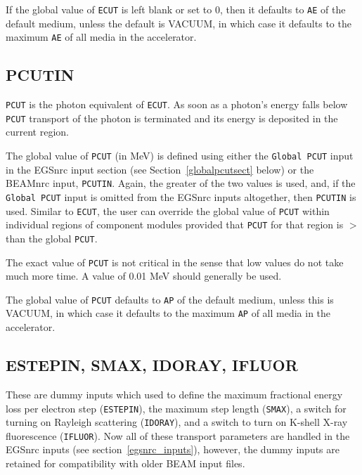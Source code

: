 \documentclass[12pt,twoside]{article}
\begin{document}
If the global value of \verb+ECUT+ is left blank or set to 0, then it defaults
to \verb+AE+ of the default medium, unless the default is VACUUM, in which
case it defaults to the maximum \verb+AE+ of all media in the accelerator.

\subsection{ PCUTIN}  \label{PCUTIN} 

{\tt PCUT} is the photon equivalent of {\tt ECUT}.  As soon as a
photon's energy falls below {\tt PCUT} transport of the photon is
terminated and its energy is deposited in the current region.

The global value of {\tt PCUT} (in MeV) is defined using either the
{\tt Global PCUT} input in the
EGSnrc input section (see Section~\ref{globalpcutsect} below) or the
BEAMnrc input, {\tt PCUTIN}.  Again, the greater of the two values is
used, and, if the {\tt Global PCUT} input is omitted from the EGSnrc
inputs altogether, then {\tt PCUTIN} is used.
Similar to {\tt ECUT}, the user can override the global value
of \verb+PCUT+ within individual regions of component modules provided
that {\tt PCUT} for that region is $>$ than the global {\tt PCUT}.

The exact value of \verb+PCUT+ is not critical in the sense
that low values do not take much more time. A value of 0.01 MeV should
generally be used.

The global value of \verb+PCUT+ defaults to \verb+AP+ of the default
medium, unless this is VACUUM, in which case it defaults to the maximum
\verb+AP+ of all media in the accelerator.

\subsection{ ESTEPIN, SMAX, IDORAY, IFLUOR}
\label{dummyinputs}

These are dummy inputs which used to define the maximum fractional energy
loss per electron step
({\tt ESTEPIN}), the maximum step length ({\tt SMAX}),
a switch for turning on Rayleigh scattering
({\tt IDORAY}), and a switch to turn on K-shell X-ray fluorescence
({\tt IFLUOR}).  Now all of these transport parameters are
handled in the EGSnrc inputs (see section~\ref{egsnrc_inputs}), however,
the dummy inputs are retained for compatibility with older BEAM
input files.
\end{document}
